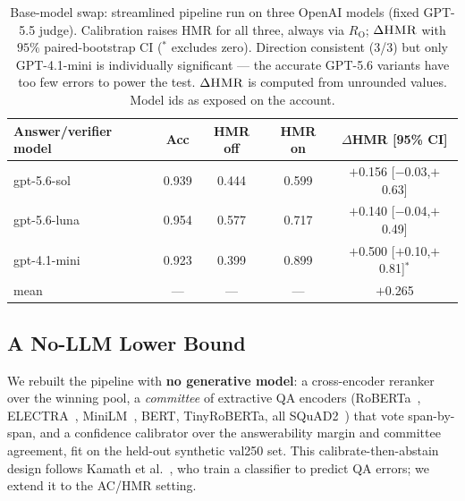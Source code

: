 \documentclass[sigconf,nonacm]{acmart}
\newcommand{\HMR}{\textsc{HMR}}
\newcommand{\RO}{R_{\mathrm{O}}}
\begin{document}
\begin{table}[t]
\centering\small
\caption{Base-model swap: streamlined pipeline run on three OpenAI models (fixed GPT-5.5
judge). Calibration raises \HMR{} for all three, always via $\RO$; $\Delta\HMR{}$ with $95\%$
paired-bootstrap CI ($^\ast$ excludes zero). Direction consistent (3/3) but only GPT-4.1-mini
is individually significant --- the accurate GPT-5.6 variants have too few errors to power the
test. $\Delta\HMR{}$ is computed from unrounded values. Model ids as exposed on the account.}
\label{tab:gptswap}
\begin{tabular}{lcccc}
\toprule
Answer/verifier model & Acc & \HMR{} off & \HMR{} on & $\Delta$\HMR{} [95\% CI] \\
\midrule
gpt-5.6-sol    & 0.939 & 0.444 & 0.599 & $+$0.156 [$-$0.03,$+$0.63] \\
gpt-5.6-luna   & 0.954 & 0.577 & 0.717 & $+$0.140 [$-$0.04,$+$0.49] \\
gpt-4.1-mini   & 0.923 & 0.399 & 0.899 & $+$0.500 [$+$0.10,$+$0.81]$^\ast$ \\
\midrule
mean           & --- & --- & --- & $+$0.265 \\
\bottomrule
\end{tabular}
\end{table}

\subsection{A No-LLM Lower Bound}
\label{sec:nollm}
We rebuilt the pipeline with \textbf{no generative model}: a cross-encoder
reranker~\cite{monobert} over the winning pool, a \emph{committee} of extractive QA
encoders (RoBERTa~\cite{roberta}, ELECTRA~\cite{electra}, MiniLM~\cite{minilm},
BERT, TinyRoBERTa, all SQuAD2~\cite{squad2}) that vote span-by-span, and a
confidence calibrator over the answerability margin and committee agreement, fit on
the held-out synthetic val250 set. This calibrate-then-abstain design follows Kamath
et al.~\cite{kamath2020}, who train a classifier to predict QA errors; we extend it
to the AC/\HMR{} setting.
\end{document}
